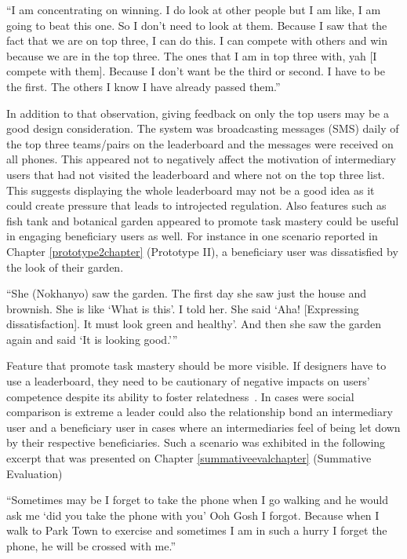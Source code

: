  {``I am concentrating on winning. I do look at other people but I am like, I am going to beat this one. So I don't need to look at them. Because I saw that the fact that we are on top three, I can do this. I can compete with others and win because we are in the top three. The ones that I am in top three with, yah [I compete with them]. Because I don't want be the third or second. I have to be the first. The others I know I have already passed them.''}

In addition to that observation, giving feedback on only the top users may be a good design consideration. The system was broadcasting messages (SMS) daily of the top three teams/pairs on the leaderboard and the messages were received on all phones. This appeared not to negatively affect the motivation of intermediary users that had not visited the leaderboard and where not on the top three list. This suggests displaying the whole leaderboard may not be a good idea as it could create pressure that leads to introjected regulation. Also features such as fish tank and botanical garden appeared to promote task mastery could be useful in engaging beneficiary users as well. For instance in one scenario reported in Chapter \ref{prototype2chapter} (Prototype II),  a beneficiary user was dissatisfied by the look of their garden. 

 {``She (Nokhanyo) saw the garden. The first day she saw just the house and brownish. She is like `What is this'. I told her. She said `Aha! [Expressing
dissatisfaction]. It must look green and healthy'. And then
she saw the garden again and said `It is looking good.'''}

Feature that promote task mastery should be more visible. If designers have to use a leaderboard, they need to be cautionary of negative impacts on users' competence despite its ability to foster relatedness~\citep{sailer2013:psychological}. In cases were social comparison is extreme a leader could also  the relationship bond an intermediary user and a beneficiary user in cases where an intermediaries feel of being let down by their respective beneficiaries. Such a scenario was exhibited in the following excerpt that was presented on Chapter \ref{summativeevalchapter} (Summative Evaluation)
 
 {``Sometimes may be I forget to take the phone when I go walking and he would ask me `did you take the phone with you' Ooh Gosh I forgot.  Because when I walk to Park Town to exercise and sometimes  I am in such a hurry I forget the phone, he will be crossed with me.''} 


